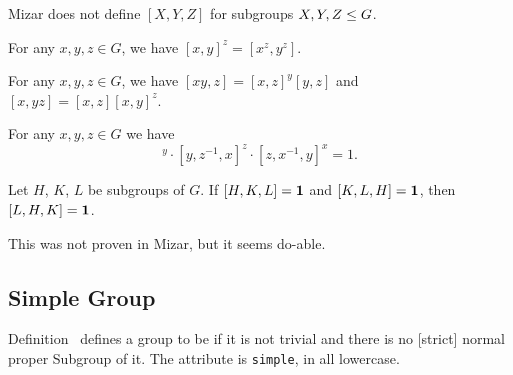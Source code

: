 \begin{def-remark}
  Mizar does not define $[X,Y,Z]$ for subgroups $X,Y,Z\leq G$.
\end{def-remark}

\begin{theorem}
For any $x,y,z\in G$, we have $[x,y]^{z} = [x^{z},y^{z}]$.
\end{theorem}

\begin{theorem}
  For any $x,y,z\in G$, we have $[xy,z] = [x,z]^{y}[y,z]$ and
  $[x,yz] = [x,z] [x,y]^{z}$.
\end{theorem}

\begin{theorem}
  For any $x,y,z\in G$ we have
  \begin{equation}
    [x, y^{-1}, z]^y\cdot[y, z^{-1}, x]^z\cdot[z, x^{-1}, y]^x = 1.
  \end{equation}
\end{theorem}

\begin{theorem}
  Let $H$, $K$, $L$ be subgroups of $G$.
  If $[H,K,L]=\mathbf{1}$ and $[K,L,H]=\mathbf{1}$,
  then $[L,H,K]=\mathbf{1}$.
\end{theorem}

This was not proven in Mizar, but it seems do-able.

\subsection{Simple Group}
Definition~ defines a group to be
if it is not trivial and there is no [strict] normal proper Subgroup of
it. The attribute is
\lstinline{simple}, in all lowercase.
